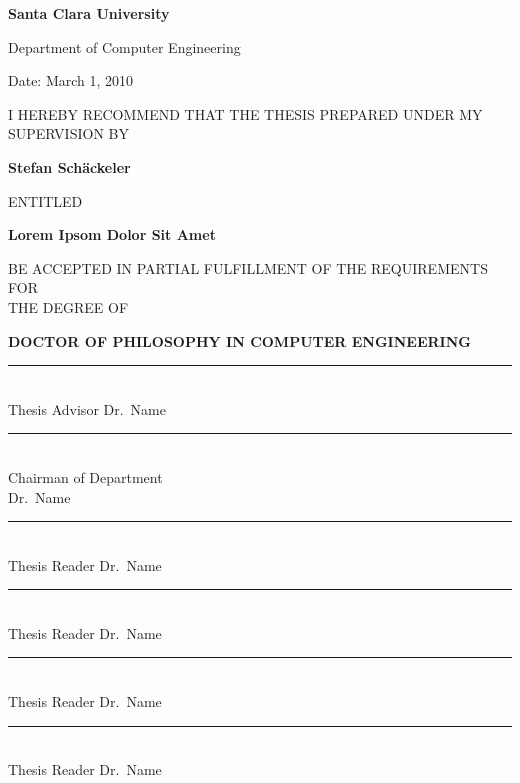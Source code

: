 
\thispagestyle{empty}%


\begin{center}
{\bf\LARGE Santa Clara University}

\par Department of Computer Engineering

\par\vspace{3mm}\hfill Date: March 1, 2010

\par\vspace{10mm}
I HEREBY RECOMMEND THAT THE THESIS PREPARED UNDER MY SUPERVISION BY

\par\vspace{2mm}
{\bf Stefan Sch\"ackeler}

\par\vspace{5mm}
ENTITLED

{\bf\large Lorem Ipsom Dolor Sit Amet}

\par\vspace{5mm}
BE ACCEPTED IN PARTIAL FULFILLMENT OF THE REQUIREMENTS FOR\\ THE DEGREE OF

\par\vspace{5mm}
{\bf DOCTOR OF PHILOSOPHY IN COMPUTER ENGINEERING}
\end{center}

\vfill

\parbox[t]{50mm}{
\rule{50mm}{0.5pt}\\Thesis Advisor Dr.~Name


\par\vspace{10mm}
\rule{50mm}{0.5pt}\\Chairman of Department\\Dr.~Name
}\hfill
\parbox[t]{50mm}{
\rule{50mm}{0.5pt}\\Thesis Reader Dr.~Name

\par\vspace{10mm}
\rule{50mm}{0.5pt}\\Thesis Reader Dr.~Name

\par\vspace{10mm}
\rule{50mm}{0.5pt}\\Thesis Reader Dr.~Name

\par\vspace{10mm}
\rule{50mm}{0.5pt}\\Thesis Reader Dr.~Name
}



